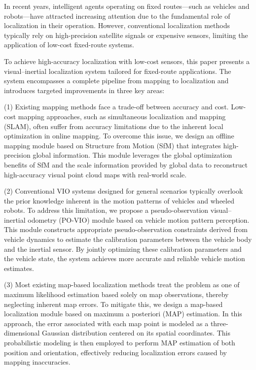 \begin{abstract*}
  In recent years, intelligent agents operating on fixed routes—such as vehicles and robots—have attracted increasing attention due to the fundamental role of localization in their operation. However, conventional localization methods typically rely on high-precision satellite signals or expensive sensors, limiting the application of low-cost fixed-route systems.

  To achieve high-accuracy localization with low-cost sensors, this paper presents a visual–inertial localization system tailored for fixed-route applications. The system encompasses a complete pipeline from mapping to localization and introduces targeted improvements in three key areas:

  (1) Existing mapping methods face a trade-off between accuracy and cost. Low-cost mapping approaches, such as simultaneous localization and mapping (SLAM), often suffer from accuracy limitations due to the inherent local optimization in online mapping. To overcome this issue, we design an offline mapping module based on Structure from Motion (SfM) that integrates high-precision global information. This module leverages the global optimization benefits of SfM and the scale information provided by global data to reconstruct high-accuracy visual point cloud maps with real-world scale.

  (2) Conventional VIO systems designed for general scenarios typically overlook the prior knowledge inherent in the motion patterns of vehicles and wheeled robots. To address this limitation, we propose a pseudo-observation visual–inertial odometry (PO-VIO) module based on vehicle motion pattern perception. This module constructs appropriate pseudo-observation constraints derived from vehicle dynamics to estimate the calibration parameters between the vehicle body and the inertial sensor. By jointly optimizing these calibration parameters and the vehicle state, the system achieves more accurate and reliable vehicle motion estimates.

  (3) Most existing map-based localization methods treat the problem as one of maximum likelihood estimation based solely on map observations, thereby neglecting inherent map errors. To mitigate this, we design a map-based localization module based on maximum a posteriori (MAP) estimation. In this approach, the error associated with each map point is modeled as a three-dimensional Gaussian distribution centered on its spatial coordinates. This probabilistic modeling is then employed to perform MAP estimation of both position and orientation, effectively reducing localization errors caused by mapping inaccuracies.


\end{abstract*}

